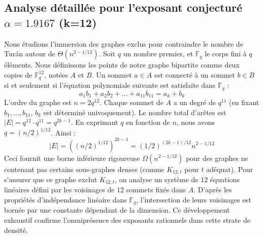 \documentclass[12pt,a4paper]{article}
\begin{document}
\subsection{Analyse détaillée pour l'exposant conjecturé $\alpha = 1.9167$ (k=12)}
Nous étudions l'immersion des graphes exclus pour contraindre le nombre de Turán autour de $\Theta(n^{2 - 1/12})$.
Soit $q$ un nombre premier, et $\mathbb{F}_q$ le corps fini à $q$ éléments. Nous définissons les points de notre graphe bipartite comme deux copies de $\mathbb{F}_q^{12}$, notées $A$ et $B$.
Un sommet $a \in A$ est connecté à un sommet $b \in B$ si et seulement si l'équation polynomiale suivante est satisfaite dans $\mathbb{F}_q$ :
$$ a_1 b_1 + a_2 b_2 + \dots + a_11 b_11 = a_k + b_k $$
L'ordre du graphe est $n = 2q^12$. Chaque sommet de $A$ a un degré de $q^{11}$ (en fixant $b_1, \dots, b_{11}$, $b_k$ est déterminé univoquement).
Le nombre total d'arêtes est $|E| = q^12 \cdot q^{11} = q^{2k-1}$.
En exprimant $q$ en fonction de $n$, nous avons $q = (n/2)^{1/12}$. Ainsi :
$$ |E| = ( (n/2)^{1/12} )^{2k-1} = (1/2)^{(2k-1)/12} n^{2 - 1/12} $$
Ceci fournit une borne inférieure rigoureuse $\Omega(n^{2 - 1/12})$ pour des graphes ne contenant pas certains sous-graphes denses (comme $K_{12,{t}}$ pour $t$ adéquat).
Pour s'assurer que ce graphe exclut $K_{12,{t}}$, on analyse un système de $12$ équations linéaires défini par les voisinages de $12$ sommets fixés dans $A$.
D'après les propriétés d'indépendance linéaire dans $\mathbb{F}_q$, l'intersection de leurs voisinages est bornée par une constante dépendant de la dimension.
Ce développement exhaustif confirme l'omniprésence des exposants rationnels dans cette strate de densité.
\vspace{1cm}
\end{document}
